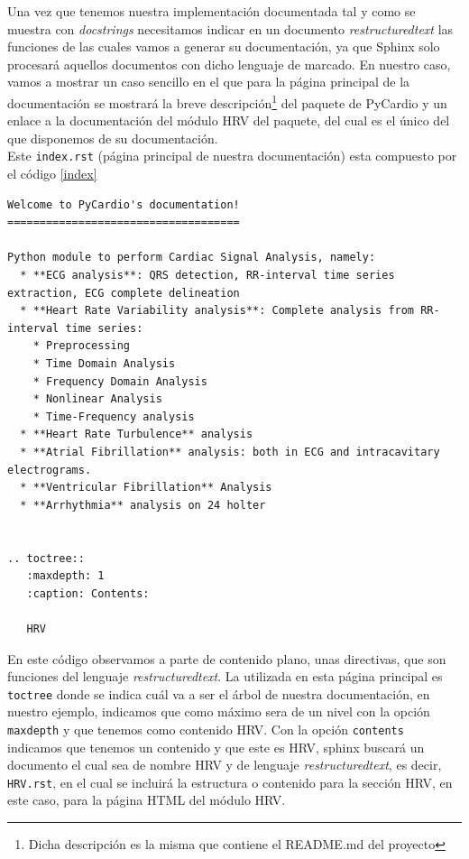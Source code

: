 Una vez que tenemos nuestra implementación documentada tal y como se muestra con \textit{docstrings} necesitamos indicar en un documento \textit{restructuredtext} las funciones de las cuales vamos a generar su documentación, ya que Sphinx solo procesará aquellos documentos con dicho lenguaje de marcado. En nuestro caso, vamos a mostrar un caso sencillo en el que para la página principal de la documentación se mostrará la breve descripción\footnote{Dicha descripción es la misma que contiene el README.md del proyecto} del paquete de PyCardio y un enlace a la documentación del módulo HRV del paquete, del cual es el único del que disponemos de su documentación. \\
Este \texttt{index.rst} (página principal de nuestra documentación) esta compuesto por el código \ref{index}
\begin{lstlisting}[caption=\texttt{index.rst},label=index]
Welcome to PyCardio's documentation!
====================================

Python module to perform Cardiac Signal Analysis, namely:
  * **ECG analysis**: QRS detection, RR-interval time series extraction, ECG complete delineation
  * **Heart Rate Variability analysis**: Complete analysis from RR-interval time series:
    * Preprocessing
    * Time Domain Analysis
    * Frequency Domain Analysis
    * Nonlinear Analysis
    * Time-Frequency analysis
  * **Heart Rate Turbulence** analysis
  * **Atrial Fibrillation** analysis: both in ECG and intracavitary electrograms.
  * **Ventricular Fibrillation** Analysis
  * **Arrhythmia** analysis on 24 holter


.. toctree::
   :maxdepth: 1
   :caption: Contents:

   HRV

\end{lstlisting}
En este código observamos a parte de contenido plano, unas directivas, que son funciones del lenguaje \textit{restructuredtext}. La utilizada en esta página principal es \texttt{toctree} donde se indica cuál va a ser el árbol de nuestra documentación, en nuestro ejemplo, indicamos que como máximo sera de un nivel con la opción \texttt{maxdepth} y que tenemos como contenido HRV. Con la opción \texttt{contents}  indicamos que tenemos un contenido y que este es HRV, sphinx buscará un documento el cual sea de nombre HRV y de lenguaje \textit{restructuredtext}, es decir, \texttt{HRV.rst}, en el cual se incluirá la estructura o contenido para la sección HRV, en este caso, para la página HTML del módulo HRV. \\
